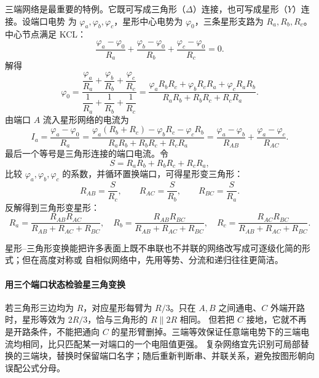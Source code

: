 三端网络是最重要的特例。它既可写成三角形（$\Delta$）连接，也可写成星形（$Y$）连接。设端口电势
为 $\varphi_a,\varphi_b,\varphi_c$，星形中心电势为 $\varphi_0$，三条星形支路为 $R_a,R_b,R_c$。
中心节点满足 KCL：
\begin{equation}
  \frac{\varphi_a-\varphi_0}{R_a}
  +\frac{\varphi_b-\varphi_0}{R_b}
  +\frac{\varphi_c-\varphi_0}{R_c}=0.
\end{equation}
解得
\begin{equation}
  \varphi_0=
  \frac{\dfrac{\varphi_a}{R_a}+\dfrac{\varphi_b}{R_b}+\dfrac{\varphi_c}{R_c}}
       {\dfrac1{R_a}+\dfrac1{R_b}+\dfrac1{R_c}}
  =\frac{\varphi_aR_bR_c+\varphi_bR_cR_a+\varphi_cR_aR_b}
  {R_aR_b+R_bR_c+R_cR_a}.
\end{equation}
由端口 $A$ 流入星形网络的电流为
\begin{equation}
  I_a=\frac{\varphi_a-\varphi_0}{R_a}
  =\frac{\varphi_a(R_b+R_c)-\varphi_bR_c-\varphi_cR_b}
  {R_aR_b+R_bR_c+R_cR_a}
  =\frac{\varphi_a-\varphi_b}{R_{AB}}
  +\frac{\varphi_a-\varphi_c}{R_{AC}}.
\end{equation}
最后一个等号是三角形连接的端口电流。令
\[
  S=R_aR_b+R_bR_c+R_cR_a,
\]
比较 $\varphi_a,\varphi_b,\varphi_c$ 的系数，并循环置换端口，可得星形变三角形：
\[
  \boxed{R_{AB}=\frac{S}{R_c},\qquad
  R_{AC}=\frac{S}{R_b},\qquad
  R_{BC}=\frac{S}{R_a}}.
\]
反解得到三角形变星形：
\[
\boxed{
  R_a=\frac{R_{AB}R_{AC}}{R_{AB}+R_{AC}+R_{BC}},\quad
  R_b=\frac{R_{AB}R_{BC}}{R_{AB}+R_{AC}+R_{BC}},\quad
  R_c=\frac{R_{AC}R_{BC}}{R_{AB}+R_{AC}+R_{BC}}.}
\]

\deltaStarFigure
{}

星形--三角形变换能把许多表面上既不串联也不并联的网络改写成可逐级化简的形式；但在高度对称或
自相似网络中，先用等势、分流和递归往往更简洁。

\paragraph{用三个端口状态检验星三角变换}
若三角形三边均为 $R$，对应星形每臂为 $R/3$。只在 $A,B$ 之间通电、$C$ 外端开路时，星形等效为 $2R/3$，恰与三角形的 $R\parallel2R$ 相同。
但若把 $C$ 接地，它就不再是开路条件，不能把通向 $C$ 的星形臂删掉。三端等效保证任意端电势下的三端电流均相同，比只匹配某一对端口的一个电阻值更强。
复杂网络宜先识别可局部替换的三端块，替换时保留端口名字；随后重新判断串、并联关系，避免按图形朝向误配公式分母。

